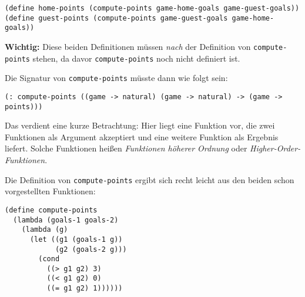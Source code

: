 \begin{verbatim}
(define home-points (compute-points game-home-goals game-guest-goals))
(define guest-points (compute-points game-guest-goals game-home-goals))
\end{verbatim}
%
\textbf{Wichtig:} Diese beiden Definitionen müssen \emph{nach} der
Definition von \texttt{compute-points} stehen, da davor
\texttt{compute-points} noch nicht definiert ist.

Die Signatur von \texttt{compute-points} müsste dann wie folgt sein:
\begin{verbatim}
(: compute-points ((game -> natural) (game -> natural) -> (game -> points)))
\end{verbatim}
Das verdient eine kurze Betrachtung: Hier liegt eine Funktion vor, die zwei
Funktionen als Argument akzeptiert und eine weitere Funktion als Ergebnis
liefert. Solche Funktionen heißen \textit{Funktionen höherer Ordnung} oder
\textit{Higher-Order-Funktionen}. 

Die Definition von \texttt{compute-points} ergibt sich recht leicht aus den
beiden schon vorgestellten Funktionen:
\begin{verbatim}
(define compute-points
  (lambda (goals-1 goals-2)
    (lambda (g)
      (let ((g1 (goals-1 g))
            (g2 (goals-2 g)))
        (cond
          ((> g1 g2) 3)
          ((< g1 g2) 0)
          ((= g1 g2) 1))))))
\end{verbatim}

